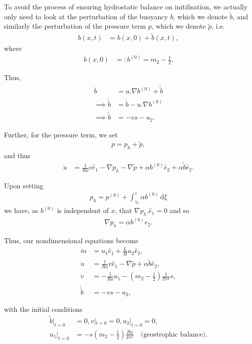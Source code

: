 \documentclass[11pt, oneside]{article}   	%
\newcommand{\eone}{\hat{e}_1}
\newcommand{\etwo}{\hat{e}_2}
\newcommand{\bt}{\tilde{b}}
\newcommand{\pt}{\tilde{p}}
\begin{document}
To avoid the process of ensuring hydrostatic balance on initilisation, we actually only need to look at the perturbation of the buoyancy \(b\), which we denote \(\bt\), and similarly the perturbation of the pressure term \(p\), which we denote \(\pt\), i.e.
\begin{align} 
b(x, t) &= b(x, 0) + \bt(x, t),
\end{align}
where
\begin{align} 
b(x, 0) &=: b^{(0)} = m_2 - \frac{1}{2}.
\end{align}

Thus,
\begin{align} 
\dot{b} &= u.\nabla b^{(0)} + \dot{\bt} \\
\implies \dot{\bt} &= \dot{b} - u.\nabla b^{(0)} \\
\implies \dot{\bt} &= -vs - u_2.
\end{align}

Further, for the pressure term, we set
\begin{align} 
p =  p_h + \pt,
\end{align}
and thus
\begin{align} 
\dot{u} &= \frac{1}{Ro} v \eone - \nabla p_h - \nabla \pt + \alpha b^{(0)} \etwo + \alpha \bt \etwo.
\end{align}

Upon setting
\begin{align} 
p_h = p^{(0)} + \int_{z_0}^z \alpha b^{(0)}\,\mathrm{d}\xi
\end{align}
we have, as \(b^{(0)}\) is independent of \(x\), that \(\nabla p_h . \eone = 0\) and so
\begin{align} 
\nabla p_h = \alpha b^{(0)} \etwo.
\end{align}

Thus, our nondimensional equations become
\begin{align} 
\dot{m} &= u_1 \eone +  \frac{L}{H} u_2 \etwo, \\
\dot{u} &= \frac{1}{Ro} v \eone - \nabla \pt + \alpha \bt \etwo, \\
\dot{v} &= -\frac{1}{Ro} u_1 - (m_2 - \frac{1}{2}) \frac{1}{Fr^2} s, \\
\dot{\bt} &= -v s - u_2,
\end{align}

with the initial conditions
\begin{align} 
\bt |_{t=0} &= 0, v |_{t=0} = 0, u_2 |_{t=0} = 0, \\
u_1 |_{t=0} &= -s (m_2 - \frac{1}{2}) \frac{Ro}{Fr^2} \quad \text{(geostrophic balance)}.
\end{align}
\end{document}
